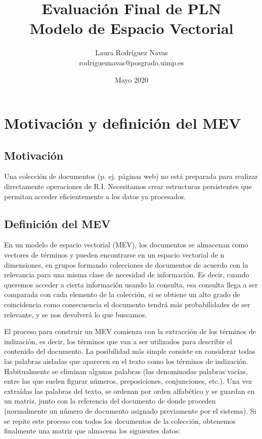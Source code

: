 \documentclass{article}
\title{Evaluación Final de PLN \\ Modelo de Espacio Vectorial}
\author{Laura Rodríguez Navas \\ rodrigueznavas@posgrado.uimp.es}
\date{Mayo 2020}
\begin{document}
\maketitle

\renewcommand{\contentsname}{Índice}
\tableofcontents

\section{Motivación y definición del MEV}

\subsection{Motivación}

Una colección de documentos (p. ej. páginas web) no está preparada para realizar directamente operaciones de R.I. Necesitamos crear estructuras persistentes que permitan acceder eficientemente a los datos ya procesados.

\subsection{Definición del MEV}

En un modelo de espacio vectorial (MEV), los documentos se almacenan como vectores de términos y pueden encontrarse en un espacio vectorial de n dimensiones, en grupos formando colecciones de documentos de acuerdo con la relevancia para una misma clase de necesidad de información. Es decir, cuando queremos acceder a cierta información usando la consulta, esa consulta llega a ser comparada con cada elemento de la colección, si se obtiene un alto grado de coincidencia como consecuencia el documento tendrá más probabilidades de ser relevante, y se nos devolverá lo que buscamos.

El proceso para construir un MEV comienza con la extracción de los términos de indización, es decir, los términos que van a ser utilizados para describir el contenido del documento. La posibilidad más simple consiste en considerar todas las palabras aisladas que aparecen en el texto como los términos de indización. Habitualmente se eliminan algunas palabras (las denominadas palabras vacías, entre las que suelen figurar números, preposiciones, conjunciones, etc.). Una vez extraídas las palabras del texto, se ordenan por orden alfabético y se guardan en un matriz, junto con la referencia del documento de donde proceden (normalmente un número de documento asignado previamente por el sistema). Si se repite este proceso con todos los documentos de la colección, obtenemos finalmente una matriz que almacena los siguientes datos:
\end{document}
